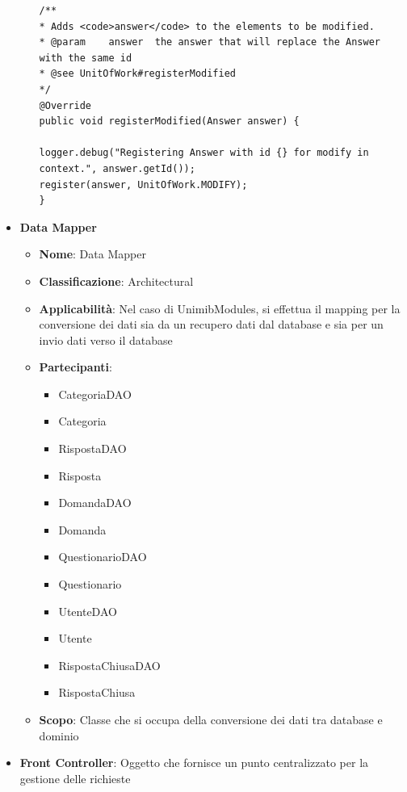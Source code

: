\documentclass[12pt]{article}
\begin{document}
\begin{itemize}
\begin{itemize}
\begin{lstlisting}
/**
* Adds <code>answer</code> to the elements to be modified.
* @param	answer	the answer that will replace the Answer with the same id
* @see UnitOfWork#registerModified
*/
@Override
public void registerModified(Answer answer) {

logger.debug("Registering Answer with id {} for modify in context.", answer.getId());
register(answer, UnitOfWork.MODIFY);
}
            \end{lstlisting}
        \end{itemize}
        
        
		\item \textbf{Data Mapper}
		\begin{itemize}
            \item \textbf{Nome}: Data Mapper
            \item \textbf{Classificazione}: Architectural
            \item \textbf{Applicabilità}: Nel caso di UnimibModules, si effettua il mapping per la conversione dei dati sia da un recupero dati dal database e sia per un invio dati verso il database
            \item \textbf{Partecipanti}:
                \begin{itemize}
                    \item CategoriaDAO
                    \item Categoria
                    \item RispostaDAO
                    \item Risposta
                    \item DomandaDAO
                    \item Domanda
                    \item QuestionarioDAO
                    \item Questionario
                    \item UtenteDAO
                    \item Utente
                    \item RispostaChiusaDAO
                    \item RispostaChiusa
                \end{itemize}
            \item \textbf{Scopo}: Classe che si occupa della conversione dei dati tra database e dominio
        \end{itemize}
		
		
		\item \textbf{Front Controller}: Oggetto che fornisce un punto centralizzato per la gestione delle richieste
		

\end{itemize}
\end{document}
